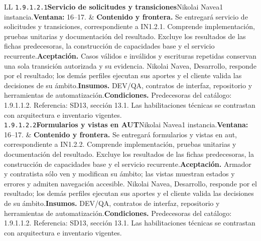 \begin{longtable}{L{\tabcolsep\relax}L{\tabcolsep\relax}}
\texttt{1.\allowbreak{}9.\allowbreak{}1.\allowbreak{}2.\allowbreak{}1}\newline{}\textbf{Servicio de solicitudes y transiciones}\newline{}Nikolai Navea\newline{}1 instancia.\newline{}\textbf{Ventana:} 16--17. & \textbf{Contenido y frontera.} Se entregará servicio de solicitudes y transiciones, correspondiente a IN1.2.1. Comprende implementación, pruebas unitarias y documentación del resultado. Excluye los resultados de las fichas predecesoras, la construcción de capacidades base y el servicio recurrente.\newline{}\textbf{Aceptación.} Casos válidos e inválidos y escrituras repetidas conservan una sola transición autorizada y su evidencia. Nikolai Navea, Desarrollo, responde por el resultado; los demás perfiles ejecutan sus aportes y el cliente valida las decisiones de su ámbito.\newline{}\textbf{Insumos.} DEV/QA, contratos de interfaz, repositorio y herramientas de automatización.\newline{}\textbf{Condiciones.} Predecesoras del catálogo: 1.9.1.1.2. Referencia: SD13, sección 13.1. Las habilitaciones técnicas se contrastan con arquitectura e inventario vigentes.\\\hline
\texttt{1.\allowbreak{}9.\allowbreak{}1.\allowbreak{}2.\allowbreak{}2}\newline{}\textbf{Formularios y vistas en AUT}\newline{}Nikolai Navea\newline{}1 instancia.\newline{}\textbf{Ventana:} 16--17. & \textbf{Contenido y frontera.} Se entregará formularios y vistas en aut, correspondiente a IN1.2.2. Comprende implementación, pruebas unitarias y documentación del resultado. Excluye los resultados de las fichas predecesoras, la construcción de capacidades base y el servicio recurrente.\newline{}\textbf{Aceptación.} Armador y contratista sólo ven y modifican su ámbito; las vistas muestran estados y errores y admiten navegación accesible. Nikolai Navea, Desarrollo, responde por el resultado; los demás perfiles ejecutan sus aportes y el cliente valida las decisiones de su ámbito.\newline{}\textbf{Insumos.} DEV/QA, contratos de interfaz, repositorio y herramientas de automatización.\newline{}\textbf{Condiciones.} Predecesoras del catálogo: 1.9.1.1.2. Referencia: SD13, sección 13.1. Las habilitaciones técnicas se contrastan con arquitectura e inventario vigentes.\\\hline

\end{longtable}
